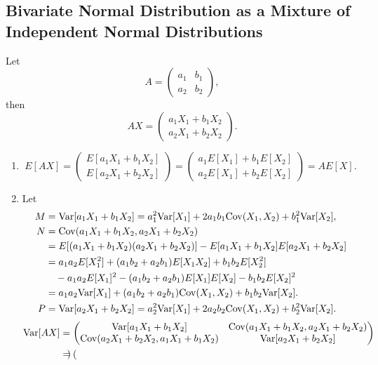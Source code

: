 \documentclass[11pt,a4paper]{article}
\begin{document}
\subsection{Bivariate Normal Distribution as a Mixture of Independent Normal Distributions}

Let $$A=\begin{pmatrix}a_1 & b_1 \\a_2 & b_2\end{pmatrix},$$
then $$AX=\begin{pmatrix}
a_1X_1 + b_1X_2 \\
a_2X_1 + b_2X_2
\end{pmatrix}.$$

\begin{enumerate}[label=\roman*)]
\item
$$E[AX]=\begin{pmatrix}
E[a_1X_1 + b_1X_2]\\
E[a_2X_1 + b_2X_2]
\end{pmatrix}=\begin{pmatrix}
a_1E[X_1] + b_1E[X_2]\\
a_2E[X_1] + b_2E[X_2]
\end{pmatrix}=AE[X].$$
\item
Let
\begin{align*}
M&={\rm Var}[a_1X_1 + b_1X_2]=a_1^2{\rm Var}[X_1]+2a_1b_1{\rm Cov}(X_1,X_2)+b_1^2{\rm Var}[X_2],\\
N&={\rm Cov}(a_1X_1 + b_1X_2,a_2X_1 + b_2X_2)\\
&=E[(a_1X_1 + b_1X_2)(a_2X_1 + b_2X_2)]-E[a_1X_1 + b_1X_2]E[a_2X_1 + b_2X_2]\\
&=a_1a_2E[X_1^2]+(a_1b_2+a_2b_1)E[X_1X_2]+b_1b_2E[X_2^2]\\
&\quad-a_1a_2E[X_1]^2-(a_1b_2+a_2b_1)E[X_1]E[X_2]-b_1b_2E[X_2]^2\\
&=a_1a_2{\rm Var}[X_1]+(a_1b_2+a_2b_1){\rm Cov}(X_1,X_2)+b_1b_2{\rm Var}[X_2].\\
P&={\rm Var}[a_2X_1 + b_2X_2]=a_2^2{\rm Var}[X_1]+2a_2b_2{\rm Cov}(X_1,X_2)+b_2^2{\rm Var}[X_2].
\end{align*}
\begin{align*}
{\rm Var}[AX]&=\begin{pmatrix}
{\rm Var}[a_1X_1 + b_1X_2] & {\rm Cov}(a_1X_1 + b_1X_2,a_2X_1 + b_2X_2)\\
{\rm Cov}(a_2X_1 + b_2X_2,a_1X_1 + b_1X_2) & {\rm Var}[a_2X_1 + b_2X_2]
\end{pmatrix}\\
&=\begin{pmatrix}

\end{pmatrix}
\end{align*}
\end{enumerate}
\end{document}
